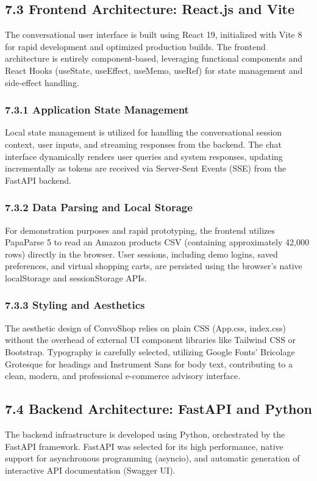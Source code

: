 \subsection*{7.3 Frontend Architecture: React.js and Vite}
The conversational user interface is built using React 19, initialized with Vite 8 for rapid development and optimized production builds. The frontend architecture is entirely component-based, leveraging functional components and React Hooks (useState, useEffect, useMemo, useRef) for state management and side-effect handling.

\subsubsection*{7.3.1 Application State Management}
Local state management is utilized for handling the conversational session context, user inputs, and streaming responses from the backend. The chat interface dynamically renders user queries and system responses, updating incrementally as tokens are received via Server-Sent Events (SSE) from the FastAPI backend.

\subsubsection*{7.3.2 Data Parsing and Local Storage}
For demonstration purposes and rapid prototyping, the frontend utilizes PapaParse 5 to read an Amazon products CSV (containing approximately 42,000 rows) directly in the browser. User sessions, including demo logins, saved preferences, and virtual shopping carts, are persisted using the browser's native localStorage and sessionStorage APIs. 

\subsubsection*{7.3.3 Styling and Aesthetics}
The aesthetic design of ConvoShop relies on plain CSS (App.css, index.css) without the overhead of external UI component libraries like Tailwind CSS or Bootstrap. Typography is carefully selected, utilizing Google Fonts' Bricolage Grotesque for headings and Instrument Sans for body text, contributing to a clean, modern, and professional e-commerce advisory interface.

\subsection*{7.4 Backend Architecture: FastAPI and Python}
The backend infrastructure is developed using Python, orchestrated by the FastAPI framework. FastAPI was selected for its high performance, native support for asynchronous programming (asyncio), and automatic generation of interactive API documentation (Swagger UI).


